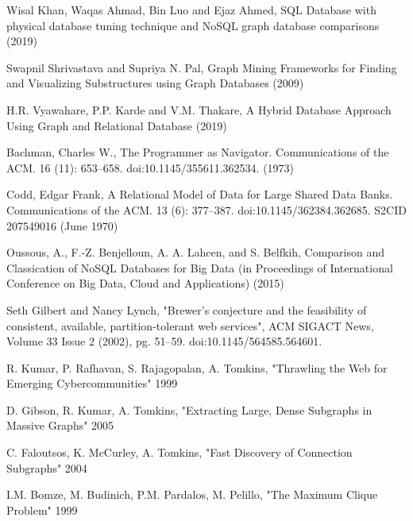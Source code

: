 \documentclass[10pt,        %
               a4paper,     %
               journal,     %
               ]{IEEEtran}
\begin{document}
%
%
\begin{thebibliography}{3}


Wisal Khan, Waqas Ahmad, Bin Luo and Ejaz Ahmed, SQL Database with physical database tuning technique and NoSQL graph database comparisons
(2019)

Swapnil Shrivastava and Supriya N. Pal, Graph Mining Frameworks for Finding and Visualizing Substructures using Graph Databases
(2009)

H.R. Vyawahare, P.P. Karde and V.M. Thakare, A Hybrid Database Approach Using Graph and Relational Database
(2019)

Bachman, Charles W., The Programmer as Navigator. Communications of the ACM. 16 (11): 653–658. doi:10.1145/355611.362534.
(1973)

Codd, Edgar Frank, A Relational Model of Data for Large Shared Data Banks. Communications of the ACM. 13 (6): 377–387. doi:10.1145/362384.362685. S2CID 207549016
(June 1970)

Oussous, A., F.-Z. Benjelloun, A. A. Lahcen, and S. Belfkih, Comparison and Classication of NoSQL Databases for Big Data (in Proceedings of International Conference on Big Data, Cloud and Applications)
(2015)

Seth Gilbert and Nancy Lynch, "Brewer's conjecture and the feasibility of consistent, available, partition-tolerant web services", ACM SIGACT News, Volume 33 Issue 2 (2002), pg. 51–59. doi:10.1145/564585.564601.

R. Kumar, P. Rafhavan, S. Rajagopalan, A. Tomkins, "Thrawling the Web for Emerging Cybercommunities" 1999

D. Gibson, R. Kumar, A. Tomkins, "Extracting Large, Dense Subgraphs in Massive Graphs" 2005

C. Faloutsos, K. McCurley, A. Tomkins, "Fast Discovery of Connection Subgraphs" 2004

I.M. Bomze, M. Budinich, P.M. Pardalos, M. Pelillo, "The Maximum Clique Problem" 1999

\end{thebibliography}
\end{document}
